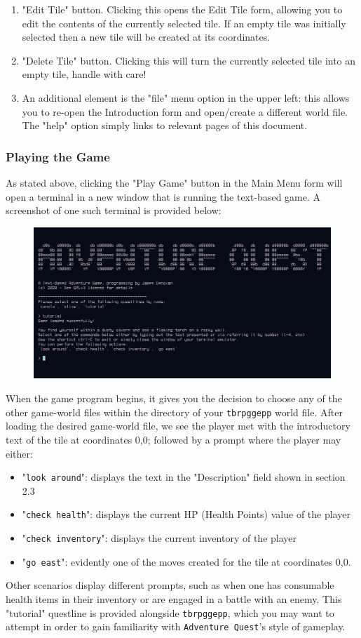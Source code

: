 \documentclass{article} \usepackage[margin=1in,headheight=57pt,headsep=0.1in]{geometry}
\begin{document}
\begin{enumerate}
\begin{itemize}
		\end{itemize}
	\item "Edit Tile" button. Clicking this opens the Edit Tile form, allowing you to edit the contents of the currently selected tile. If an empty tile was initially selected then a new tile will be created at its coordinates.
	\item "Delete Tile" button. Clicking this will turn the currently selected tile into an empty tile, handle with care!
	\item An additional element is the "file" menu option in the upper left: this allows you to re-open the Introduction form and open/create a different world file. The "help" option simply links to relevant pages of this document.
\end{enumerate}
\subsubsection{Playing the Game}
As stated above, clicking the "Play Game" button in the Main Menu form will open a terminal in a new window that is running the text-based game. A screenshot of one such terminal is provided below:
\begin{figure}[H]
	\centering
	\includegraphics[width=1.0\textwidth]{./gameplay.png}
\end{figure}
When the game program begins, it gives you the decision to choose any of the other game-world files within the directory of your \texttt{tbrpggepp} world file. After loading the desired game-world file, we see the player met with the introductory text of the tile at coordinates 0,0; followed by a prompt where the player may either:
\begin{itemize}
	\item "\texttt{look around}": displays the text in the "Description" field shown in section 2.3
	\item "\texttt{check health}": displays the current HP (Health Points) value of the player
	\item "\texttt{check inventory}": displays the current inventory of the player
	\item "\texttt{go east}": evidently one of the moves created for the tile at coordinates 0,0.
\end{itemize}
Other scenarios display different prompts, such as when one has consumable health items in their inventory or are engaged in a battle with an enemy. This "tutorial" questline is provided alongside \texttt{tbrpggepp}, which you may want to attempt in order to gain familiarity with \texttt{Adventure Quest}'s style of gameplay.
\newpage
\end{document}

